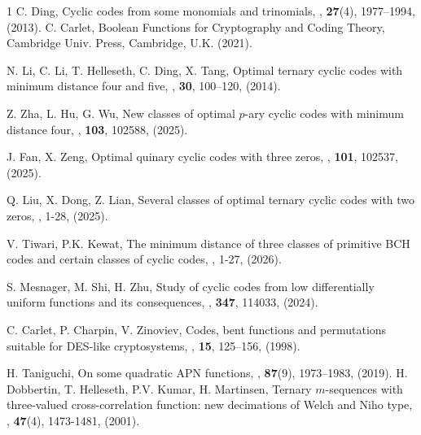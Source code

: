 \documentclass[pdflatex,sn-mathphys-num]{sn-jnl}%
\theoremstyle{thmstyleone}%
\theoremstyle{thmstyletwo}%
\theoremstyle{thmstylethree}%
\begin{document}
\begin{thebibliography}{1}
    C. Ding, \newblock Cyclic codes from some monomials and trinomials, , \textbf{27}(4), 1977–1994, (2013).
C. Carlet, \newblock Boolean Functions for Cryptography and Coding Theory, Cambridge Univ. Press, Cambridge, U.K. (2021).

N. Li, C. Li, T. Helleseth, C. Ding, X. Tang, \newblock Optimal ternary cyclic codes with minimum distance four and five, , \textbf{30}, 100–120, (2014).

Z. Zha, L. Hu, G. Wu, \newblock New classes of optimal $p$-ary cyclic codes with minimum distance four, , \textbf{103}, 102588, (2025).

J. Fan, X. Zeng, \newblock Optimal quinary cyclic codes with three zeros, , \textbf{101}, 102537, (2025).


Q. Liu, X. Dong, Z. Lian, \newblock Several classes of optimal ternary cyclic codes with two zeros, , 1-28, (2025).

V. Tiwari, P.K. Kewat, \newblock The minimum distance of three classes of primitive BCH codes and certain classes of cyclic codes, , 1-27, (2026).

S. Mesnager, M. Shi, H. Zhu, \newblock Study of cyclic codes from low differentially uniform functions and its consequences, , \textbf{347}, 114033, (2024).

  C. Carlet, P. Charpin, V. Zinoviev, \newblock Codes, bent functions and permutations suitable for DES-like
cryptosystems, , \textbf{15}, 125–156, (1998).

   H. Taniguchi, \newblock On some quadratic APN functions, , \textbf{87}(9), 1973–1983, (2019).
H. Dobbertin, T. Helleseth, P.V. Kumar, H. Martinsen, \newblock Ternary $m$-sequences with three-valued cross-correlation function: new decimations of Welch and Niho type, , \textbf{47}(4), 1473-1481, (2001).


\end{thebibliography}
\end{document}
